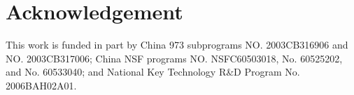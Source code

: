 \documentclass{elsart}
\begin{document}
\section{Acknowledgement}
This work is funded in part by China 973 subprograms
NO. 2003CB316906 and NO. 2003CB317006; China NSF
programs NO. NSFC60503018, No. 60525202, and No.
60533040; and National Key Technology R&D Program No.
2006BAH02A01.
\par

\end{document}
